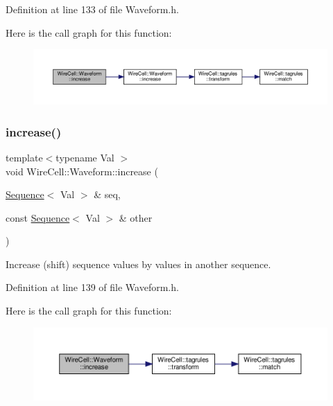 Definition at line 133 of file Waveform.\+h.

Here is the call graph for this function\+:
\nopagebreak
\begin{figure}[H]
\begin{center}
\leavevmode
\includegraphics[width=350pt]{namespace_wire_cell_1_1_waveform_a3e92e2c63b937617bf8870412e7a6da7_cgraph}
\end{center}
\end{figure}
\mbox{\label{namespace_wire_cell_1_1_waveform_a5f2540f66c9584343f87cbe624c76943}} 
\subsubsection{\texorpdfstring{increase()}{increase()}\hspace{0.1cm}{\footnotesize\ttfamily [3/3]}}
{\footnotesize\ttfamily template$<$typename Val $>$ \\
void Wire\+Cell\+::\+Waveform\+::increase (\begin{DoxyParamCaption}\item[{\hyperlink{namespace_wire_cell_1_1_waveform_a1d2a1b672e3b220dcd64a994531de95d}{Sequence}$<$ Val $>$ \&}]{seq,  }\item[{const \hyperlink{namespace_wire_cell_1_1_waveform_a1d2a1b672e3b220dcd64a994531de95d}{Sequence}$<$ Val $>$ \&}]{other }\end{DoxyParamCaption})}



Increase (shift) sequence values by values in another sequence. 



Definition at line 139 of file Waveform.\+h.

Here is the call graph for this function\+:
\nopagebreak
\begin{figure}[H]
\begin{center}
\leavevmode
\includegraphics[width=350pt]{namespace_wire_cell_1_1_waveform_a5f2540f66c9584343f87cbe624c76943_cgraph}
\end{center}
\end{figure}
\mbox{\label{namespace_wire_cell_1_1_waveform_aafc9307577968266045319c91ce3ab66}} 
